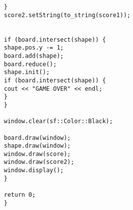 \documentclass[11pt]{amsart}
\begin{document}
\begin{verbatim}
}
score2.setString(to_string(score1));


if (board.intersect(shape)) {
shape.pos.y -= 1;
board.add(shape);
board.reduce();
shape.init();
if (board.intersect(shape)) {
cout << "GAME OVER" << endl;
}
}

window.clear(sf::Color::Black);

board.draw(window);
shape.draw(window);
window.draw(score);
window.draw(score2);
window.display();
}

return 0;
}

\end{verbatim}
\end{document}
